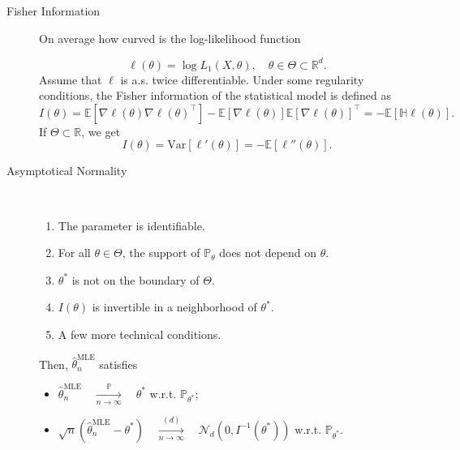 \documentclass[a4paper, 10pt,landscape]{article}
\newcommand{\var}{\textrm{Var}}
\begin{document}
\begin{multicols*}{4}
\begin{description}
	\item[Fisher Information] On average how curved is the log-likelihood function
		
		$$\ell(\theta)=\log L_1\left(X,\theta\right),\quad\theta\in\Theta\subset\mathbb{R}^d.$$
		Assume that $\ell$ is a.s. twice differentiable. Under some regularity conditions, the Fisher information of the statistical model is defined as
		$$I(\theta)=\mathbb{E}\left[\nabla\ell(\theta)\nabla\ell(\theta)^\intercal\right]-\mathbb{E}\left[\nabla\ell(\theta)\right]\mathbb{E}\left[\nabla\ell(\theta)\right]^\intercal=-\mathbb{E}\left[\mathbb{H}\ell(\theta)\right].$$
		If $\Theta\subset\mathbb{R}$, we get
		$$I(\theta)=\var\left[\ell'(\theta)\right]=-\mathbb{E}\left[\ell''(\theta)\right].$$
	
	\item[Asymptotical Normality]~
		\begin{enumerate}
		\item The parameter is identifiable.
		\item For all $\theta\in\Theta$, the support of $\mathbb{P}_\theta$ does not depend on $\theta$.
		\item $\theta^*$ is not on the boundary of $\Theta$.
		\item $I(\theta)$ is invertible in a neighborhood of $\theta^*$.
		\item A few more technical conditions.
		\end{enumerate}
		Then, $\hat{\theta}_n^\text{MLE}$ satisfies
		\begin{itemize}
			\item $\hat{\theta}_n^\text{MLE}\quad\xrightarrow[n\rightarrow\infty]{\mathbb{P}}\quad\theta^*$ w.r.t. $\mathbb{P}_{\theta^*}$;
			\item $\sqrt{n}\left(\hat{\theta}_n^\text{MLE}-\theta^*\right)\quad\xrightarrow[n\rightarrow\infty]{(d)}\quad\mathcal{N}_d\left(0,I^{-1}(\theta^*)\right)$ w.r.t. $\mathbb{P}_{\theta^*}$.
		\end{itemize}		
	

\end{description}
\end{multicols*}
\end{document}
